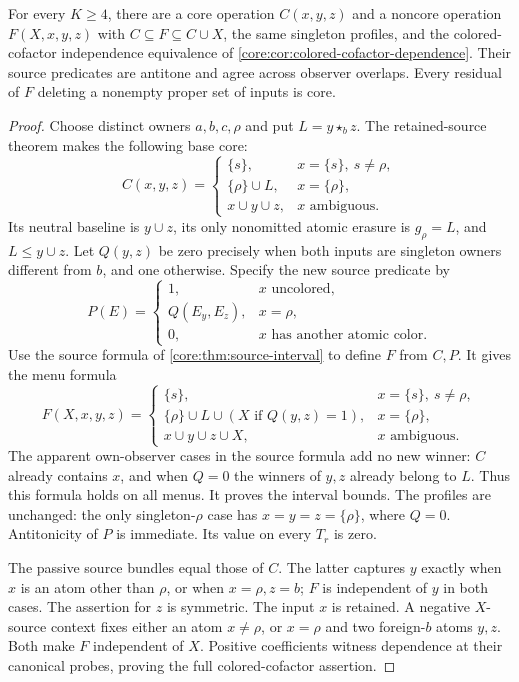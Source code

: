 \begin{proposition}
\label{core:prop:interval-neutral-obstruction}
For every $K\geq4$, there are a core operation $C(x,y,z)$ and a
noncore operation $F(X,x,y,z)$ with $C\subseteq F\subseteq C\cup X$,
the same singleton profiles, and the colored-cofactor independence
equivalence of \cref{core:cor:colored-cofactor-dependence}.
Their source predicates are antitone and agree across observer overlaps.
Every residual of $F$ deleting a nonempty proper set of inputs is core.
\end{proposition}
\begin{proof}
Choose distinct owners $a,b,c,\rho$ and put $L=y\star_b z$.
The retained-source theorem makes the following base core:
\[
 C(x,y,z)=\begin{cases}
 \{s\},&x=\{s\},\ s\ne\rho,\\
 \{\rho\}\cup L,&x=\{\rho\},\\
 x\cup y\cup z,&x\text{ ambiguous}.
 \end{cases}
\]
Its neutral baseline is $y\cup z$, its only nonomitted atomic
erasure is $g_\rho=L$, and $L\leq y\cup z$.
Let $Q(y,z)$ be zero precisely when both inputs are singleton owners
different from $b$, and one otherwise. Specify the new source predicate by
\[
 P(E)=\begin{cases}
 1,&x\text{ uncolored},\\
 Q(E_y,E_z),&x=\rho,\\
 0,&x\text{ has another atomic color}.
 \end{cases}
\]
Use the source formula of \cref{core:thm:source-interval} to define
$F$ from $C,P$. It gives the menu formula
\[
 F(X,x,y,z)=\begin{cases}
 \{s\},&x=\{s\},\ s\ne\rho,\\
 \{\rho\}\cup L\cup(X\text{ if }Q(y,z)=1),&x=\{\rho\},\\
 x\cup y\cup z\cup X,&x\text{ ambiguous}.
 \end{cases}
\]
The apparent own-observer cases in the source formula add no new winner:
$C$ already contains $x$, and when $Q=0$ the winners of $y,z$ already
belong to $L$. Thus this formula holds on all menus.
It proves the interval bounds. The profiles are unchanged: the only
singleton-$\rho$ case has $x=y=z=\{\rho\}$, where $Q=0$.
Antitonicity of $P$ is immediate. Its value on every $T_r$ is zero.

The passive source bundles equal those of $C$. The latter captures $y$
exactly when $x$ is an atom other than $\rho$, or when $x=\rho,z=b$;
$F$ is independent of $y$ in both cases. The assertion for $z$ is
symmetric. The input $x$ is retained. A negative $X$-source context
fixes either an atom $x\ne\rho$, or $x=\rho$ and two foreign-$b$
atoms $y,z$. Both make $F$ independent of $X$. Positive coefficients
witness dependence at their canonical probes, proving the full
colored-cofactor assertion.


\end{proof}
